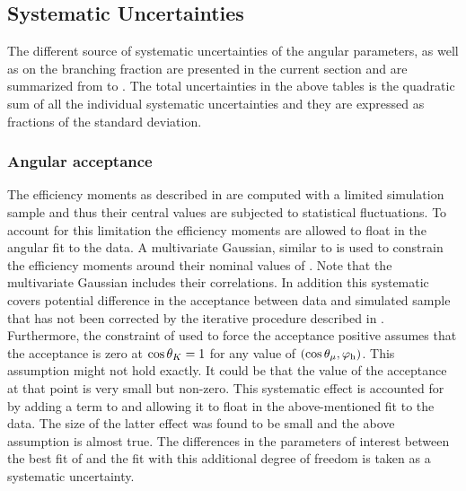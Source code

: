 \subsection{Systematic Uncertainties}
\label{systemics}
The different source of systematic uncertainties of the \Bs angular parameters, as well as on the branching fraction
are presented in the current section and are summarized from  to .
The total uncertainties in the above tables is the quadratic sum of all the individual systematic uncertainties and
they are expressed as fractions of the standard deviation.

\subsubsection{Angular acceptance}
\label{systAngAcc}
The efficiency moments as described in  are computed with a limited simulation sample
and thus their central values are subjected to statistical fluctuations. To account for this limitation the
efficiency moments are allowed to float in the angular fit to the data. A multivariate Gaussian, similar to 
is used to constrain the efficiency moments around their nominal values of .
Note that the multivariate Gaussian includes their correlations. In addition this systematic covers
potential difference in the acceptance between data and simulated sample
that has not been corrected by the iterative procedure described in . Furthermore,
the constraint of  used to force the acceptance positive assumes that the acceptance is zero
at $\cos\theta_{K}=1$ for any value of $(\cos\theta_{\mu},\varphi_{\rm h})$. This assumption might not hold exactly. It could be
that the value of the acceptance at that point is very small but non-zero. This systematic effect is accounted for
by adding a term to  and allowing it to float in the above-mentioned fit to the data.
The size of the latter effect was found to be small and the above assumption is almost true. The differences
in the parameters of interest between the best fit of  and the fit with this additional
degree of freedom is taken as a systematic uncertainty.

